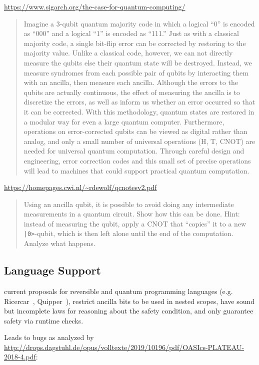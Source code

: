 \documentclass[sigplan,10pt,review,anonymous]{acmart}
\begin{document}
\url{https://www.sigarch.org/the-case-for-quantum-computing/}
\begin{quote}
  Imagine a 3-qubit quantum majority code in which a logical “0” is
  encoded as “000” and a logical “1” is encoded as “111.”  Just as
  with a classical majority code, a single bit-flip error can be
  corrected by restoring to the majority value.  Unlike a classical
  code, however, we can not directly measure the qubits else their
  quantum state will be destroyed.  Instead, we measure syndromes from
  each possible pair of qubits by interacting them with an ancilla,
  then measure each ancilla.  Although the errors to the qubits are
  actually continuous, the effect of measuring the ancilla is to
  discretize the errors, as well as inform us whether an error
  occurred so that it can be corrected.  With this methodology,
  quantum states are restored in a modular way for even a large
  quantum computer.  Furthermore, operations on error-corrected qubits
  can be viewed as digital rather than analog, and only a small number
  of universal operations (H, T, CNOT) are needed for universal
  quantum computation.  Through careful design and engineering, error
  correction codes and this small set of precise operations will lead
  to machines that could support practical quantum computation.
\end{quote}

\url{https://homepages.cwi.nl/~rdewolf/qcnotesv2.pdf}
\begin{quote}
  Using an ancilla qubit, it is possible to avoid doing any
  intermediate measurements in a quantum circuit. Show how this can be
  done.  Hint: instead of measuring the qubit, apply a CNOT that
  “copies” it to a new \verb.|0>.-qubit, which is then left alone
  until the end of the computation. Analyze what happens.
\end{quote}

\subsection{Language Support}
 
current proposals for reversible
and quantum programming languages
(e.g. Ricercar~\cite{10.1007/978-3-319-20860-2_13},
Quipper~\cite{Green:2013:QSQ:2491956.2462177}), restrict ancilla bits
to be used in nested scopes, have sound but incomplete laws for
reasoning about the safety condition, and only guarantee safety via
runtime checks.

Leads to bugs as analyzed by
\url{http://drops.dagstuhl.de/opus/volltexte/2019/10196/pdf/OASIcs-PLATEAU-2018-4.pdf}:
\end{document}
